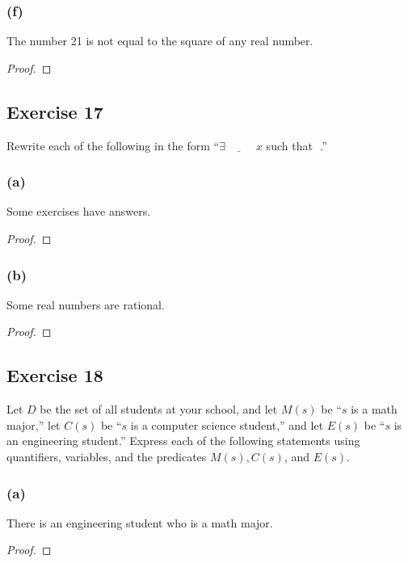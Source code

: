 \documentclass[14pt]{extarticle}
\newcommand{\fbl}{\underline{\hspace{1cm}}\,\,}
\newcommand{\te}{\exists}
\begin{document}
\subsubsection{(f)}
The number 21 is not equal to the square of any real number.

\begin{proof}

\end{proof}

\subsection{Exercise 17}
Rewrite each of the following in the form “$\te \fbl x$ such that \fbl.”

\subsubsection{(a)}
Some exercises have answers.

\begin{proof}

\end{proof}

\subsubsection{(b)}
Some real numbers are rational.

\begin{proof}

\end{proof}

\subsection{Exercise 18}
Let $D$ be the set of all students at your school, and let $M(s)$ be “$s$ is a math major,” let $C(s)$ be “$s$ is a computer science student,” and let $E(s)$ be “$s$ is an engineering student.” Express each of the following statements using quantifiers, variables, and the predicates $M(s), C(s)$, and $E(s)$.

\subsubsection{(a)}
There is an engineering student who is a math major.

\begin{proof}

\end{proof}
\end{document}
